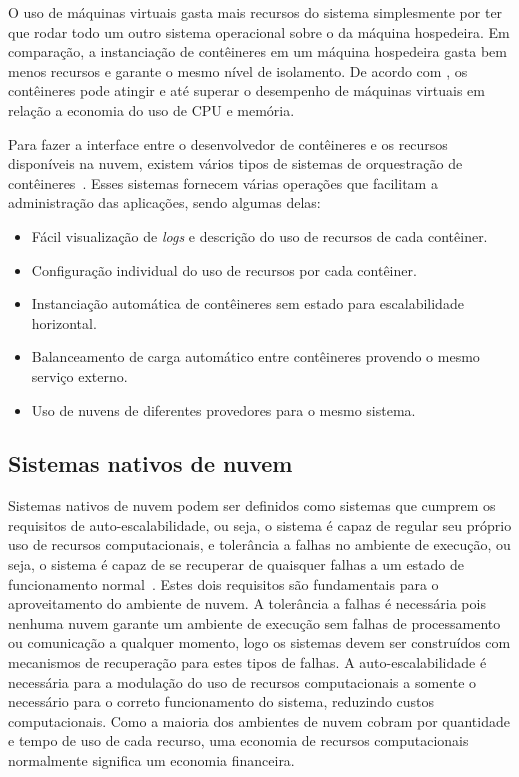O uso de máquinas virtuais gasta mais recursos do sistema simplesmente por ter que rodar todo um outro sistema operacional sobre o da máquina hospedeira. Em comparação, a instanciação de contêineres em um máquina hospedeira gasta bem menos recursos e garante o mesmo nível de isolamento. De acordo com  \cite{7095802}, os contêineres pode atingir e até superar o desempenho de máquinas virtuais em relação a economia do uso de CPU e memória. %

Para fazer a interface entre o desenvolvedor de contêineres e os recursos disponíveis na nuvem, existem vários tipos de sistemas de orquestração de contêineres~\citep{Kubernetes,Mesos,Swarm}. Esses sistemas fornecem várias operações que facilitam a administração das aplicações, sendo algumas delas:
\begin{itemize}
    \item Fácil visualização de \textit{logs} e descrição do uso de recursos de cada contêiner.
    \item Configuração individual do uso de recursos por cada contêiner.
    \item Instanciação automática de contêineres sem estado para escalabilidade horizontal.
    \item Balanceamento de carga automático %
    entre contêineres provendo o mesmo serviço externo.
    \item Uso de nuvens de diferentes provedores para o mesmo sistema.
\end{itemize}




\subsection{Sistemas nativos de nuvem}
\label{sec:cloud-native-systems}
Sistemas nativos de nuvem podem ser definidos como sistemas que cumprem os  requisitos de auto-escalabilidade, ou seja, o sistema é capaz de regular seu próprio uso de recursos computacionais, e tolerância a falhas no ambiente de execução, ou seja, o sistema é capaz de se recuperar de quaisquer falhas a um estado de funcionamento normal~\citep{garrison2017cloud,gilbert2018cloud}. Estes dois requisitos são fundamentais para o aproveitamento do ambiente de nuvem. A tolerância a falhas é necessária pois nenhuma nuvem garante um ambiente de execução sem falhas de processamento ou comunicação a qualquer momento, logo os sistemas devem ser construídos com mecanismos de recuperação para estes tipos de falhas. A auto-escalabilidade é necessária para a modulação do uso de recursos computacionais a somente o necessário para o correto funcionamento do sistema, reduzindo custos computacionais. Como a maioria dos ambientes de nuvem cobram por quantidade e tempo de uso de cada recurso, uma economia de recursos computacionais normalmente significa um economia financeira.

